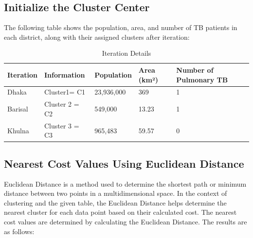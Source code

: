 \documentclass[conference]{IEEEtran}
\begin{document}
    \subsection{Initialize the Cluster Center}
    
    The following table shows the population, area, and number of TB patients in each district, along with their assigned clusters after iteration:
    
    \begin{table}[h]
        \centering
        \begin{tabularx}{\linewidth}{|p{0.9cm}|p{1.75cm}|p{1.3cm}|p{0.7cm}|p{2cm}|}
        \hline
        \textbf{Iteration} & \textbf{Information} & \textbf{Population} & \textbf{Area (km²)} & \textbf{Number of Pulmonary TB} \\
        \hline
        Dhaka & Cluster1= C1 & 23,936,000 & 369 & 1 \\ \hline
        Barisal & Cluster 2 = C2 & 549,000 & 13.23 & 1 \\ \hline
        Khulna & Cluster 3 = C3 & 965,483 & 59.57 & 0 \\
        \hline
        \end{tabularx}
        \caption{Iteration Details}
        \label{tab:iteration_details}
    \end{table}
    
    \subsection{Nearest Cost Values Using Euclidean Distance}
    
    Euclidean Distance is a method used to determine the shortest path or minimum distance between two points in a multidimensional
space. In the context of clustering and the given table, the Euclidean Distance helps determine the nearest cluster for each data point 
based on their calculated cost. The nearest cost values are determined by calculating the Euclidean Distance. 
The results are as follows:   
    
\end{document}
